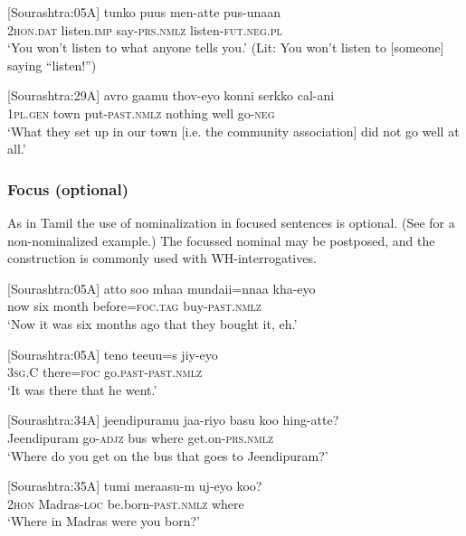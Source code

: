 \ea\label{smith:ex:30}
{}[Sourashtra:05A\footnotemark{}]
\gll tunko puus men-atte pus-unaan\\
2\textsc{hon}.\textsc{dat} listen.\textsc{imp} say-\textsc{prs}.\textsc{nmlz} listen-\textsc{fut}.\textsc{neg}.\textsc{pl}\\
`You won't listen to what anyone tells you.' 
(Lit: You won't listen to [someone] saying ``listen!'')
\z


\ea\label{smith:ex:31}
{}[Sourashtra:29A]
\gll avro gaamu thov-eyo konni serkko cal-ani\\
1\textsc{pl}.\textsc{gen} town put-\textsc{past}.\textsc{nmlz} nothing well go-\textsc{neg}\\
`What they set up in our town [i.e. the community association] did not go well at all.'
\z


\subsubsection{Focus (optional)}%

As in Tamil the use of nominalization in focused sentences is optional. (See  for a non-nominalized example.) The focussed nominal may be postposed, and the construction is commonly used with WH-interrogatives.

\ea\label{smith:ex:32}
{}[Sourashtra:05A]
\gll atto soo mha{\textrtaild}a munda{\textrtaild}ii=nnaa kha{\textrtaild}-eyo\\
now six month before=\textsc{foc}.\textsc{tag} buy-\textsc{past}.\textsc{nmlz}\\
`Now it was six months ago that they bought it, eh.'
\z

\ea\label{smith:ex:33}
{}[Sourashtra:05A]
\gll teno tee{\textrtaild}uu=s jiy-eyo\\
3\textsc{sg}.C there=\textsc{foc} go.\textsc{past}-\textsc{past}.\textsc{nmlz}\\
`It was there that he went.'
\z

\ea\label{smith:ex:34}
{}[Sourashtra:34A]
\gll jeendipuramu jaa-riyo basu koo{\textrtailt} hing-atte?\\
Jeendipuram go-\textsc{adjz} bus where get.on-\textsc{prs}.\textsc{nmlz}\\
`Where do you get on the bus that goes to Jeendipuram?'
\z

\ea\label{smith:ex:35}
{}[Sourashtra:35A]
\gll tumi me{\textrtaild}raasu-m uj-eyo koo{\textrtailt}? \\
2\textsc{hon} Madras-\textsc{loc} be.born-\textsc{past}.\textsc{nmlz} where\\
`Where in Madras were you born?'
\z

